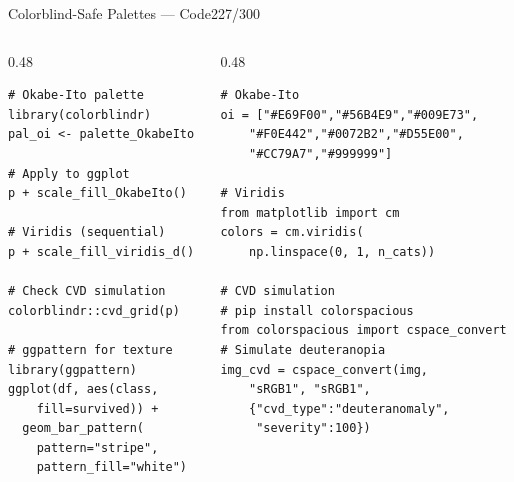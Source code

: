 \documentclass[10pt]{beamer}
\newcommand{\smark}[1]{\hfill{\scriptsize\color{codegray}#1}}
\begin{document}
\begin{frame}[fragile]{Colorblind-Safe Palettes --- Code}\smark{227/300}
\begin{columns}[T]
\begin{column}{0.48\textwidth}
\begin{lstlisting}[style=Rstyle]
# Okabe-Ito palette
library(colorblindr)
pal_oi <- palette_OkabeIto

# Apply to ggplot
p + scale_fill_OkabeIto()

# Viridis (sequential)
p + scale_fill_viridis_d()

# Check CVD simulation
colorblindr::cvd_grid(p)

# ggpattern for texture
library(ggpattern)
ggplot(df, aes(class,
    fill=survived)) +
  geom_bar_pattern(
    pattern="stripe",
    pattern_fill="white")
\end{lstlisting}
\end{column}
\begin{column}{0.48\textwidth}
\begin{lstlisting}[style=Pystyle]
# Okabe-Ito
oi = ["#E69F00","#56B4E9","#009E73",
    "#F0E442","#0072B2","#D55E00",
    "#CC79A7","#999999"]

# Viridis
from matplotlib import cm
colors = cm.viridis(
    np.linspace(0, 1, n_cats))

# CVD simulation
# pip install colorspacious
from colorspacious import cspace_convert
# Simulate deuteranopia
img_cvd = cspace_convert(img,
    "sRGB1", "sRGB1",
    {"cvd_type":"deuteranomaly",
     "severity":100})
\end{lstlisting}
\end{column}
\end{columns}
\end{frame}
\end{document}
